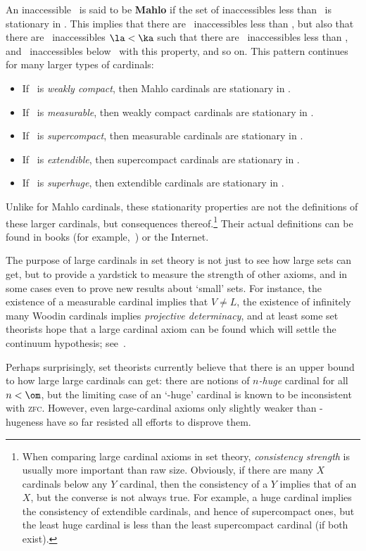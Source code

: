 \documentclass{amsart}
\def\zfc{\textsc{zfc}}
\begin{document}
An inaccessible \ka\ is said to be \textbf{Mahlo} if the set of
inaccessibles less than \ka\ is stationary in \ka.  This implies that
there are \ka\ inaccessibles less than \ka, but also that there are
\ka\ inaccessibles $\la<\ka$ such that there are \la\ inaccessibles
less than \la, and \ka\ inaccessibles below \ka\ with this property,
and so on.  This pattern continues for many larger types of cardinals:
\begin{itemize}
\item If \ka\ is \emph{weakly compact}, then Mahlo cardinals are
  stationary in \ka.
\item If \ka\ is \emph{measurable}, then weakly compact
  cardinals are stationary in \ka.
\item If \ka\ is \emph{supercompact}, then measurable cardinals are
  stationary in \ka.
\item If \ka\ is \emph{extendible}, then supercompact cardinals are
  stationary in \ka.
\item If \ka\ is \emph{superhuge}, then extendible cardinals are
  stationary in \ka.
\end{itemize}
Unlike for Mahlo cardinals, these stationarity properties are not the
definitions of these larger cardinals, but consequences
thereof.\footnote{When comparing large cardinal axioms in set theory,
  \emph{consistency strength} is usually more important than raw size.
  Obviously, if there are many $X$ cardinals below any $Y$ cardinal,
  then the consistency of a $Y$ implies that of an $X$, but the
  converse is not always true.  For example, a huge cardinal implies
  the consistency of extendible cardinals, and hence of supercompact
  ones, but the least huge cardinal is less than the least
  supercompact cardinal (if both exist).}  Their actual definitions
can be found in books (for
example,~\cite{jech:set-theory,kanamori:higher-infinite}) or the
Internet.

The purpose of large cardinals in set theory is not just to see how
large sets can get, but to provide a yardstick to measure the strength
of other axioms, and in some cases even to prove new results about
`small' sets.  For instance, the existence of a measurable cardinal
implies that $V\neq L$, the existence of infinitely many Woodin
cardinals implies \emph{projective determinacy}, and at least some set
theorists hope that a large cardinal axiom can be found which will
settle the continuum hypothesis;
see~\cite{believing-axioms-i,believing-axioms-ii}.

Perhaps surprisingly, set theorists currently believe that there is an
upper bound to how large large cardinals can get: there are notions of
\emph{$n$-huge} cardinal for all $n<\om$, but the limiting case of an
`\om-huge' cardinal is known to be inconsistent with \zfc.  However,
even large-cardinal axioms only slightly weaker than \om-hugeness have
so far resisted all efforts to disprove them.
\end{document}
